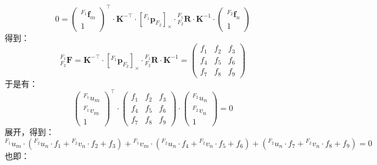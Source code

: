 \documentclass[12pt, onecolumn]{article}
\newcommand\liehat[1]{\left[ #1 \right]_\times}
\begin{document}
	\begin{equation}
	0=\begin{pmatrix}
	{^{F_1}\boldsymbol{f}_m}\\1
	\end{pmatrix}^\top \cdot\boldsymbol{K}^{-\top}\cdot
	\liehat{^{F_1}\boldsymbol{p}_{F_2}}\cdot
	{^{F_1}_{F_2}\boldsymbol{R}}\cdot\boldsymbol{K}^{-1}\cdot\begin{pmatrix}
	{^{F_2}\boldsymbol{f}_n}\\1
	\end{pmatrix}
	\end{equation}
	得到：
	\begin{equation}
	{^{F_1}_{F_2}\boldsymbol{F}}=\boldsymbol{K}^{-\top}\cdot
	\liehat{^{F_1}\boldsymbol{p}_{F_2}}\cdot
	{^{F_1}_{F_2}\boldsymbol{R}}\cdot\boldsymbol{K}^{-1}=
	\begin{pmatrix}
	f_1&f_2&f_3\\
	f_4&f_5&f_6\\
	f_7&f_8&f_9
	\end{pmatrix}
	\end{equation}
	于是有：
	\begin{equation}
	\begin{pmatrix}
	{^{F_1}u_{m}}\\{^{F_1}v_{m}}\\1
	\end{pmatrix}^\top\cdot
	\begin{pmatrix}
	f_1&f_2&f_3\\
	f_4&f_5&f_6\\
	f_7&f_8&f_9
	\end{pmatrix}\cdot
	\begin{pmatrix}
	{^{F_2}u_{n}}\\{^{F_2}v_{n}}\\1
	\end{pmatrix}=0
	\end{equation}
	展开，得到：
	\begin{equation}
	{^{F_1}u_{m}}\cdot\left({^{F_2}u_{n}}\cdot f_1+{^{F_2}v_{n}}\cdot f_2+ f_3 \right) +
	{^{F_1}v_{m}}\cdot\left({^{F_2}u_{n}}\cdot f_4+{^{F_2}v_{n}}\cdot f_5+ f_6 \right) +
	\left({^{F_2}u_{n}}\cdot f_7+{^{F_2}v_{n}}\cdot f_8+ f_9 \right)=0
	\end{equation}
	也即：
\end{document}
